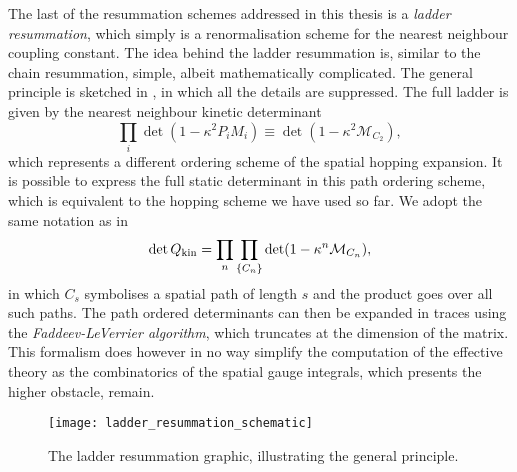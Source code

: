 The last of the resummation schemes addressed in this thesis is a \emph{ladder
resummation}, which simply is a renormalisation scheme for the nearest neighbour
coupling constant. The idea behind the ladder resummation is, similar to the
chain resummation, simple, albeit mathematically complicated. The general
principle is sketched in , in
which all the details are suppressed. The full ladder is given by the nearest
neighbour kinetic determinant
%
\begin{equation}
  \prod_i \det (1 - \kappa^2 P_i M_i) \equiv \det (1 - \kappa^2 \mathcal{M}_{C_2}),
\end{equation}
%
which represents a different ordering scheme of the spatial hopping expansion.
It is possible to express the full static determinant in this path ordering
scheme, which is equivalent to the hopping scheme we have used so far. We adopt
the same notation as in \citep{Rindlisbacher:2015pea}
%
\begin{equation}
  \det Q_{\text{kin}} = \prod_{n} \prod_{\{C_n\}} \det(1 - \kappa^n \mathcal{M}_{C_n}),
\end{equation}
%
in which $C_s$ symbolises a spatial path of length $s$ and the product goes over
all such paths. The path ordered determinants can then be expanded in traces
using the \emph{Faddeev-LeVerrier algorithm}, which truncates at the dimension
of the matrix. This formalism does however in no way simplify the computation of
the effective theory as the combinatorics of the spatial gauge integrals, which
presents the higher obstacle, remain.

\begin{figure}[t]
  \begin{center}
    \texttt{[image: ladder\_resummation\_schematic]}
  \end{center}
  \caption{The ladder resummation graphic, illustrating the general principle.}
  \label{fig:ladder_schematic}
\end{figure}

